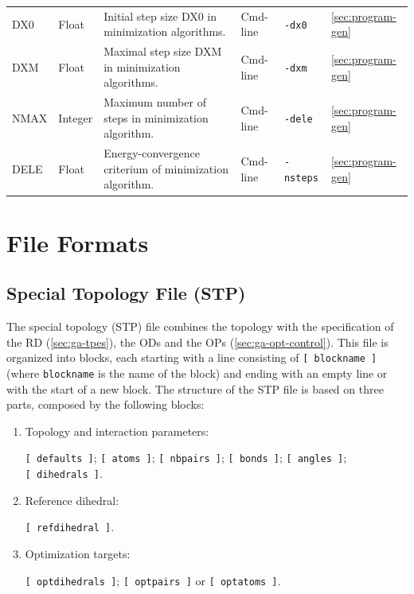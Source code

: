 \documentclass[10pt,a4paper]{report}
\numberwithin{equation}{section}
\begin{document}
\begin{landscape}
\begin{center}
\begin{longtable}{llllll}
      DX0 & Float & Initial step size DX0 in minimization algorithms. & Cmd-line & \texttt{-dx0} & \autoref{sec:program-gen}\\
      DXM & Float & Maximal step size DXM in minimization algorithms. & Cmd-line & \texttt{-dxm} & \autoref{sec:program-gen}\\
      NMAX & Integer & Maximum number of steps in minimization algorithm. & Cmd-line & \texttt{-dele} & \autoref{sec:program-gen}\\
      DELE & Float & Energy-convergence criterium of minimization algorithm. & Cmd-line & \texttt{-nsteps} & \autoref{sec:program-gen}\\
      \bottomrule
      \end{longtable}
    \end{center}
\end{landscape}

\section{File Formats}
\label{sec:file-formats-file-formats}

\subsection{Special Topology File (STP)}
\label{sec:file-formats-STP}

The special topology (STP) file combines the topology with the
specification of the RD (\autoref{sec:ga-tpes}), the ODs and the OPs
(\autoref{sec:ga-opt-control}).  This file is organized into blocks,
each starting with a line consisting of \texttt{[~blockname~]} (where
\texttt{blockname} is the name of the block) and ending with an empty
line or with the start of a new block.  The structure of the STP file
is based on three parts, composed by the following blocks:
\begin{enumerate}
\item Topology and interaction parameters:\par \texttt{[~defaults~]}; \texttt{[~atoms~]}; \texttt{[~nbpairs~]}; \texttt{[~bonds~]}; \texttt{[~angles~]}; \texttt{[~dihedrals~]}.
\item Reference dihedral:\par\texttt{[~refdihedral~]}.
\item Optimization targets:\par\texttt{[~optdihedrals~]}; \texttt{[~optpairs~]} or \texttt{[~optatoms~]}.
\end{enumerate}
\end{document}
